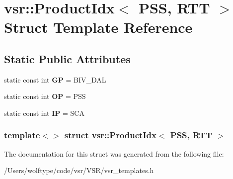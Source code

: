 \hypertarget{structvsr_1_1_product_idx_3_01_p_s_s_00_01_r_t_t_01_4}{\section{vsr\-:\-:Product\-Idx$<$ P\-S\-S, R\-T\-T $>$ Struct Template Reference}
\label{structvsr_1_1_product_idx_3_01_p_s_s_00_01_r_t_t_01_4}
}
\subsection*{Static Public Attributes}
\begin{DoxyCompactItemize}
\item 
\hypertarget{structvsr_1_1_product_idx_3_01_p_s_s_00_01_r_t_t_01_4_a484c86c5f8e9d13195159d221663e5b7}{static const int {\bfseries G\-P} = B\-I\-V\-\_\-\-D\-A\-L}\label{structvsr_1_1_product_idx_3_01_p_s_s_00_01_r_t_t_01_4_a484c86c5f8e9d13195159d221663e5b7}

\item 
\hypertarget{structvsr_1_1_product_idx_3_01_p_s_s_00_01_r_t_t_01_4_a319dacb07f427545a94d675db26ffd0a}{static const int {\bfseries O\-P} = P\-S\-S}\label{structvsr_1_1_product_idx_3_01_p_s_s_00_01_r_t_t_01_4_a319dacb07f427545a94d675db26ffd0a}

\item 
\hypertarget{structvsr_1_1_product_idx_3_01_p_s_s_00_01_r_t_t_01_4_a6785e24d5324cb90c9218dabed0239e4}{static const int {\bfseries I\-P} = S\-C\-A}\label{structvsr_1_1_product_idx_3_01_p_s_s_00_01_r_t_t_01_4_a6785e24d5324cb90c9218dabed0239e4}

\end{DoxyCompactItemize}
\subsubsection*{template$<$$>$ struct vsr\-::\-Product\-Idx$<$ P\-S\-S, R\-T\-T $>$}



The documentation for this struct was generated from the following file\-:\begin{DoxyCompactItemize}
\item 
/\-Users/wolftype/code/vsr/\-V\-S\-R/vsr\-\_\-templates.\-h\end{DoxyCompactItemize}
